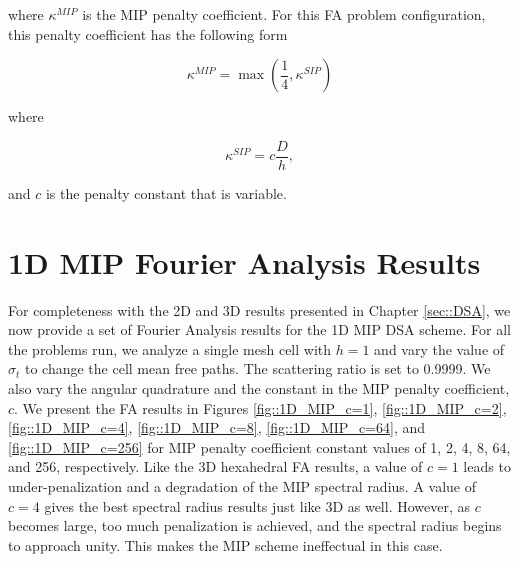 \noindent where $\kappa^{MIP}$ is the MIP penalty coefficient. For this FA problem configuration, this penalty coefficient has the following form

\begin{equation}
\label{eq::App_DSA_MIP_penalty}
\kappa^{MIP} = \max (\frac{1}{4} , \kappa^{SIP})
\end{equation}

\noindent where

\begin{equation}
\label{eq::App_DSA_IP_penalty}
\kappa^{SIP} = c \frac{D}{h},
\end{equation}

\noindent and $c$ is the penalty constant that is variable.

\newpage
\section{1D MIP Fourier Analysis Results}
\label{sec::App_DSA_resutls}

For completeness with the 2D and 3D results presented in Chapter \ref{sec::DSA}, we now provide a set of Fourier Analysis results for the 1D MIP DSA scheme. For all the problems run, we analyze a single mesh cell with $h=1$ and vary the value of $\sigma_t$ to change the cell mean free paths. The scattering ratio is set to 0.9999. We also vary the angular quadrature and the constant in the MIP penalty coefficient, $c$. We present the FA results in Figures \ref{fig::1D_MIP_c=1}, \ref{fig::1D_MIP_c=2}, \ref{fig::1D_MIP_c=4}, \ref{fig::1D_MIP_c=8}, \ref{fig::1D_MIP_c=64}, and \ref{fig::1D_MIP_c=256} for MIP penalty coefficient constant values of 1, 2, 4, 8, 64, and 256, respectively. Like the 3D hexahedral FA results, a value of $c=1$ leads to under-penalization and a degradation of the MIP spectral radius. A value of $c=4$ gives the best spectral radius results just like 3D as well. However, as $c$ becomes large, too much penalization is achieved, and the spectral radius begins to approach unity. This makes the MIP scheme ineffectual in this case.



